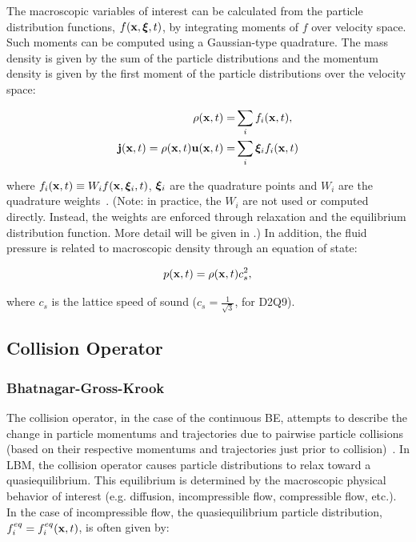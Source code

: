 The macroscopic variables of interest can be calculated from the particle distribution functions, $f(\mathbf{x}, \boldsymbol{\xi}, t)$, by integrating moments of $f$ over velocity space.
Such moments can be computed using a Gaussian-type quadrature.
The mass density is given by the sum of the particle distributions and the momentum density is given by the first moment of the particle distributions over the velocity space:

\begin{align}
\label{eq:rho} \rho(\mathbf{x}, t) =& \sum_{i} f_i(\mathbf{x}, t), \\
\label{eq:mom} \mathbf{j}(\mathbf{x}, t) = \rho(\mathbf{x}, t) \mathbf{u}(\mathbf{x}, t) =& \sum_{i} \boldsymbol{\xi}_i f_i(\mathbf{x}, t)
\end{align}

\noindent where $f_i(\mathbf{x}, t) \equiv W_i f(\mathbf{x}, \boldsymbol{\xi}_i, t)$, $\boldsymbol{\xi}_i$ are the quadrature points and $W_i$ are the quadrature weights~\cite{he1997priori}.
(Note: in practice, the $W_i$ are not used or computed directly.
Instead, the weights are enforced through relaxation and the equilibrium distribution function.
More detail will be given in .) 
In addition, the fluid pressure is related to macroscopic density through an equation of state:

\begin{equation}
\label{eq:pres} p(\mathbf{x}, t) = \rho(\mathbf{x}, t) c_s^2,
\end{equation}

\noindent where $c_s$ is the lattice speed of sound ($c_s = \frac{1}{\sqrt{3}}$, for D2Q9).

\subsection{Collision Operator} \label{sec:colop}

\subsubsection{Bhatnagar-Gross-Krook} \label{sec:bgk}

The collision operator, in the case of the continuous BE, attempts to describe the change in particle momentums and trajectories due to pairwise particle collisions (based on their respective momentums and trajectories just prior to collision)~\cite{Cer90}.
In LBM, the collision operator causes particle distributions to relax toward a quasiequilibrium. 
This equilibrium is determined by the macroscopic physical behavior of interest (e.g. diffusion, incompressible flow, compressible flow, etc.).
In the case of incompressible flow, the quasiequilibrium particle distribution, $f_i^{eq} = f_i^{eq}(\mathbf{x}, t)$, is often given by:

